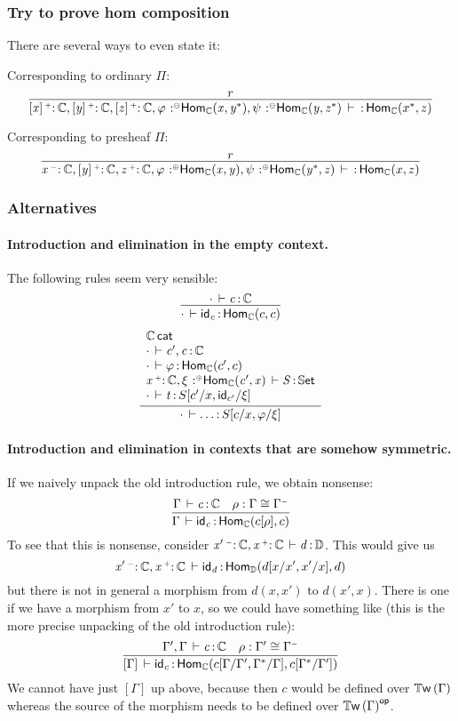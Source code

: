 \documentclass[11pt]{article}
\theoremstyle{plain}
\begin{document}
\subsubsection{Try to prove hom composition}
There are several ways to even state it:

Corresponding to ordinary $\Pi$:
\[
	\infer{
		\oftp{\twcatvar x \co \C, \twcatvar y \co \C, \twcatvar z \co \C, \tpvar \vfi \conc{\Hom{\C}{x}{y^*}}, \tpvar \psi \conc{\Hom{\C}{y}{z^*}}}{}{\Hom{\C}{x^*}{z}}
	}{
		r
	}
\]

Corresponding to presheaf $\Pi$:
\[
	\infer{
		\oftp{\catvar x \con \C, \twcatvar y \co \C, \catvar z \co \C, \tpvar \vfi \coc{\Hom{\C}{x}{y}}, \tpvar \psi \coc{\Hom{\C}{y^*}{z}}}{}{\Hom{\C}{x}{z}}
	}{
		r
	}
\]

\subsubsection{Alternatives}
\paragraph{Introduction and elimination in the empty context.}
The following rules seem very sensible:
\[
	\infer{
		\oftp{\cdot}{\idm c}{\Hom{\C}{c}{c}}
	}{
		\oftp{\cdot}{c}{\C}
	}
\]
\begin{equation}
	\infer{
		\oftp{\cdot}{\ldots}{S[c/x, \vfi/\xi]}
	}{ \begin{array}{l}
		\wfdtp{\C} \\
		\oftp{\cdot}{c', c}{\C} \\
		\oftp{\cdot}{\vfi}{\Hom{\C}{c'}{c}} \\
		\oftp{\catvar{x}{\co}{\C}, \tpvar{\xi}{\coc}{\Hom{\C}{c'}{x}} }{S}{\types} \\
		\oftp{\cdot}{t}{S[c'/x, \idm{c'}/\xi]}
	\end{array} }
\end{equation}

\paragraph{Introduction and elimination in contexts that are somehow symmetric.}
If we naively unpack the old introduction rule, we obtain nonsense:
\[
	\infer{
		\oftp{\Gamma}{\idm c}{\Hom{\C}{c[\rho]}{c}}
	}{
		\oftp{\Gamma}{c}{\C} &
		\rho : \Gamma \cong \Gamma^\con
	}
\]
To see that this is nonsense, consider ${\mathit{x'} \,^{{\text{\tiny $\mathord{-}$}}}{:}^{\,} \mathit{\mathbb{C}}, \mathit{x} \,^{{\text{\tiny $\mathord{+}$}}}{:}^{\,} \mathit{\mathbb{C}}} \, \vdash \mathit{d} \, \mathit{:} \, \mathbb{D}$. This would give us
\[
	{\mathit{x'} \,^{{\text{\tiny $\mathord{-}$}}}{:}^{\,} \mathit{\mathbb{C}}, \mathit{x} \,^{{\text{\tiny $\mathord{+}$}}}{:}^{\,} \mathit{\mathbb{C}}} \, \vdash \mathit{\mathsf{id}_{d}} \, \mathit{:} \, \mathsf{Hom}_{\mathbb{D}}(d[x/x', x'/x],d)
\]
but there is not in general a morphism from $d(x, x')$ to $d(x', x)$. There is one if we have a morphism from $x'$ to $x$, so we could have something like (this is the more precise unpacking of the old introduction rule):
\[
	\infer{
		\oftp{[\Gamma]}{\idm c}{\Hom{\C}{c[\Gamma/\Gamma', \Gamma^*/\Gamma]}{c[\Gamma^*/\Gamma']}}
	}{
		\oftp{\Gamma', \Gamma}{c}{\C} &
		\rho : \Gamma' \cong \Gamma^\con
	}
\]
We cannot have just $[\Gamma]$ up above, because then $c$ would be defined over $\mathbb{T}\mathsf{w}\left(\Gamma\right)$ whereas the source of the morphism needs to be defined over $\mathbb{T}\mathsf{w}\left(\Gamma\right) ^{\mathsf{op}}$.
\end{document}
